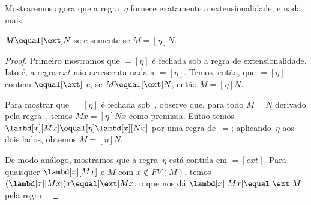 \documentclass[../../../include/open-logic-section]{subfiles}
\begin{document}
Mostraremos agora que a regra~$\eta$ fornece exatamente a extensionalidade, e
nada mais.

\begin{thm}
  $M \equal[\ext] N$ se e somente se $M \equal[\eta] N$.
\end{thm}

\begin{proof}
  Primeiro mostramos que $\equal[\eta]$ é fechada sob a regra de
  extensionalidade. Isto é, a regra $ext$ não acrescenta nada a
  $\equal[\eta]$. Temos, então, que $\equal[\eta]$ contém $\equal[\ext]$ e,
  se $M \equal[\ext] N$, então $M \equal[\eta] N$.

  Para mostrar que $\equal[\eta]$ é fechada sob~\ext, observe que, para todo
  $M \equal N$ derivado pela regra~\ext{}, temos $Mx \equal[\eta] Nx$ como
  premissa. Então temos $\lambd[x][Mx] \equal[\eta] \lambd[x][Nx]$ por uma
  regra de~$\equal$; aplicando~$\eta$ aos dois
  lados, obtemos $M \equal[\eta] N$.

  De modo análogo, mostramos que a regra~$\eta$ está contida em
  $\equal[ext]$. Para quaisquer $\lambd[x][Mx]$ e $M$ com $x \notin FV(M)$,
  temos $(\lambd[x][Mx])x \equal[\ext] Mx$, o que nos dá
  $\lambd[x][Mx] \equal[\ext] M$ pela regra~\ext{}.
\end{proof}
\end{document}
